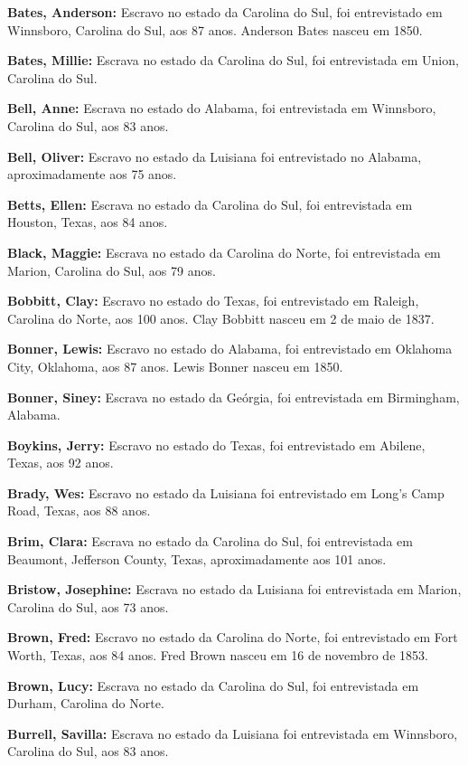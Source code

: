 \textbf{Bates, Anderson:} Escravo no estado da Carolina do Sul, foi
entrevistado em Winnsboro, Carolina do Sul, aos 87 anos. Anderson Bates
nasceu em 1850.

\textbf{Bates, Millie:} Escrava no estado da Carolina do Sul, foi
entrevistada em Union, Carolina do Sul.

\textbf{Bell, Anne:} Escrava no estado do Alabama, foi entrevistada em
Winnsboro, Carolina do Sul, aos 83 anos.

\textbf{Bell, Oliver:} Escravo no estado da Luisiana foi entrevistado no
Alabama, aproximadamente aos 75 anos.

\textbf{Betts, Ellen:} Escrava no estado da Carolina do Sul, foi
entrevistada em Houston, Texas, aos 84 anos.

\textbf{Black, Maggie:} Escrava no estado da Carolina do Norte, foi
entrevistada em Marion, Carolina do Sul, aos 79 anos.

\textbf{Bobbitt, Clay:} Escravo no estado do Texas, foi entrevistado em
Raleigh, Carolina do Norte, aos 100 anos. Clay Bobbitt nasceu em 2 de
maio de 1837.

\textbf{Bonner, Lewis:} Escravo no estado do Alabama, foi entrevistado
em Oklahoma City, Oklahoma, aos 87 anos. Lewis Bonner nasceu em 1850.

\textbf{Bonner, Siney:} Escrava no estado da Geórgia, foi entrevistada
em Birmingham, Alabama.

\textbf{Boykins, Jerry:} Escravo no estado do Texas, foi entrevistado em
Abilene, Texas, aos 92 anos.

\textbf{Brady, Wes:} Escravo no estado da Luisiana foi entrevistado em
Long's Camp Road, Texas, aos 88 anos.

\textbf{Brim, Clara:} Escrava no estado da Carolina do Sul, foi
entrevistada em Beaumont, Jefferson County, Texas, aproximadamente aos
101 anos.

\textbf{Bristow, Josephine:} Escrava no estado da Luisiana foi
entrevistada em Marion, Carolina do Sul, aos 73 anos.

\textbf{Brown, Fred:} Escravo no estado da Carolina do Norte, foi
entrevistado em Fort Worth, Texas, aos 84 anos. Fred Brown nasceu em 16
de novembro de 1853.

\textbf{Brown, Lucy:} Escrava no estado da Carolina do Sul, foi
entrevistada em Durham, Carolina do Norte.

\textbf{Burrell, Savilla:} Escrava no estado da Luisiana foi
entrevistada em Winnsboro, Carolina do Sul, aos 83 anos.

